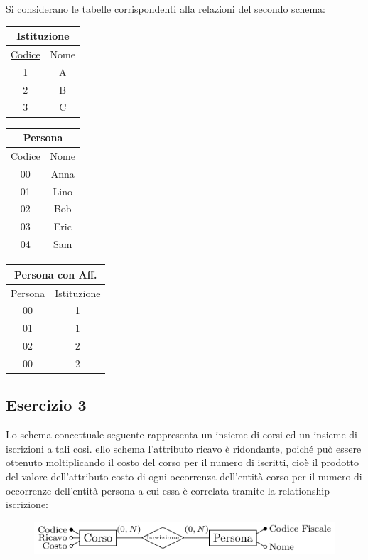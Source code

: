 \documentclass{article}
\numberwithin{equation}{subsection}
\begin{document}
Si considerano le tabelle corrispondenti alla relazioni del secondo schema:
\begin{center}
    \begin{tabular}{|c|c|}
        \hline
        \multicolumn{2}{|c|}{Istituzione}\\
        \hline
        \underline{Codice} & Nome\\
        \hline
        1 & A\\\hline 2&B\\\hline 3&C\\\hline
    \end{tabular}
    \begin{tabular}{|c|c|}
        \hline
        \multicolumn{2}{|c|}{Persona}\\
        \hline
        \underline{Codice}& Nome\\
        \hline
        00&Anna\\\hline 01&Lino\\\hline 02&Bob\\\hline 03&Eric\\\hline 04 & Sam\\\hline
    \end{tabular}
    \begin{tabular}{|c|c|}
        \hline
        \multicolumn{2}{|c|}{Persona con Aff.}\\
        \hline
        \underline{Persona} & \underline{Istituzione}\\
        \hline
        00&1\\\hline 01 & 1\\\hline 02&2\\\hline 00&2\\\hline
    \end{tabular}
\end{center}

\subsection{Esercizio 3}

Lo schema concettuale seguente rappresenta un insieme di corsi ed un insieme di iscrizioni a tali cosi. ello schema l'attributo ricavo è 
ridondante, poiché può essere ottenuto moltiplicando il costo del corso per il numero di iscritti, cioè il prodotto del valore dell'attributo costo di ogni 
occorrenza dell'entità corso per il numero di occorrenze dell'entità persona a cui essa è correlata tramite la relationship iscrizione:
\begin{figure}[H]%
    \centering%
    \includegraphics{esercizio_3_29-11-24.pdf}%
\end{figure}
\end{document}
